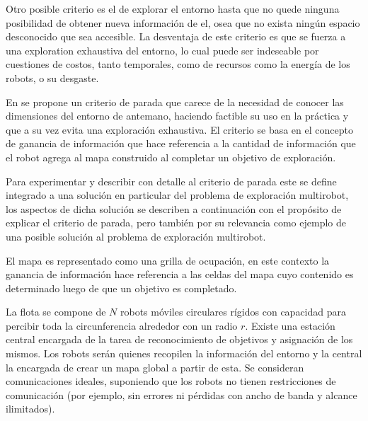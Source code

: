 Otro posible criterio es el de explorar el entorno hasta que no quede ninguna posibilidad de obtener nueva información de el, osea que no exista ningún espacio desconocido que sea accesible. La desventaja de este criterio es que se fuerza a una exploration exhaustiva del entorno, lo cual puede ser indeseable por cuestiones de costos, tanto temporales, como de recursos como la energía de los robots, o su desgaste.

En \cite{amorin2019novel} se propone un criterio de parada que carece de la necesidad de conocer las dimensiones del entorno de antemano, haciendo factible su uso en la práctica y que a su vez evita una exploración exhaustiva. El criterio se basa en el concepto de ganancia de información que hace referencia a la cantidad de información que el robot agrega al mapa construido al completar un objetivo de exploración. 

Para experimentar y describir con detalle al criterio de parada este se define integrado a una solución en particular del problema de exploración multirobot, los aspectos de dicha solución se describen a continuación con el propósito de explicar el criterio de parada, pero también por su relevancia como ejemplo de una posible solución al problema de exploración multirobot.

El mapa es representado como una grilla de ocupación, en este contexto la ganancia de información hace referencia a las celdas del mapa cuyo contenido es determinado luego de que un objetivo es completado. 

La flota se compone de $N$ robots móviles circulares rígidos con capacidad para percibir toda la circunferencia alrededor con un radio $r$. Existe una estación central encargada de la tarea de reconocimiento de objetivos y asignación de los mismos. Los robots serán quienes recopilen la información del entorno y la central la encargada de crear un mapa global a partir de esta. Se consideran comunicaciones ideales, suponiendo que los robots no tienen restricciones de comunicación (por ejemplo, sin errores ni pérdidas con ancho de banda y alcance ilimitados). %

